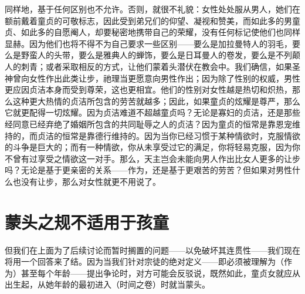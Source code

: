 同样地，基于任何区别也不允许。否则，就很不礼貌：女性处处服从男人，她们在额前戴着童贞的可敬标志，因此受到弟兄们的仰望、凝视和赞美，而如此多的男童贞、如此多的自愿阉人，却要秘密地携带自己的荣耀，没有任何标记使他们也同样显赫。因为他们也将不得不为自己要求一些区别——要么是加拉曼特人的羽毛，要么是野蛮人的头带，要么是雅典人的蝉饰，要么是日耳曼人的卷发，要么是不列颠人的刺青；或者采取相反的方式，让他们蒙着头潜伏在教会中。我们确信，如果圣神曾向女性作出此类让步，祂理当更愿意向男性作出；因为除了性别的权威，男性更应因贞洁本身而受到尊荣，这也更相宜。他们的性别对女性越是热切和炽热，那么这种更大热情的贞洁所包含的劳苦就越多；因此，如果童贞的炫耀是尊严，那么它就更配得一切炫耀。因为贞洁难道不超越童贞吗？无论是寡妇的贞洁，还是那些经同意已经弃绝了婚姻所包含的共同耻辱之人的贞洁？因为童贞的恒常是靠恩宠维持的，而贞洁的恒常是靠德行维持的。因为当你已经习惯于某种情欲时，克服情欲的斗争是巨大的；而有一种情欲，你从未享受过它的满足，你将轻易克服，因为你不曾有过享受之情欲这一对手。那么，天主岂会未能向男人作出比女人更多的让步吗？无论是基于更亲密的关系——作为，还是基于更艰苦的劳苦？但如果对男性什么也没有让步，那么对女性就更不用说了。\par


\section{蒙头之规不适用于孩童}

但我们在上面为了后续讨论而暂时搁置的问题——以免破坏其连贯性——我们现在将用一个回答来了结。因为当我们针对宗徒的绝对定义——即必须被理解为（作为）甚至每个年龄——提出争论时，对方可能会反驳说，既然如此，童贞女就应从出生起，从她年龄的最初进入（时间之卷）时就当蒙头。\par

